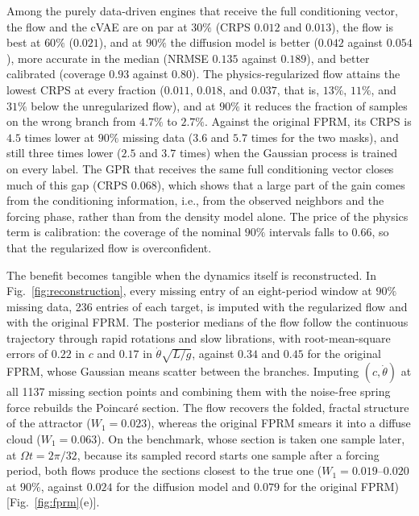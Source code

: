 Among the purely data-driven engines that receive the full conditioning vector, the flow and the cVAE are on par at $30\%$ (CRPS $0.012$ and $0.013$), the flow is best at $60\%$ ($0.021$), and at $90\%$ the diffusion model is better ($0.042$ against $0.054$), more accurate in the median (NRMSE $0.135$ against $0.189$), and better calibrated (coverage $0.93$ against $0.80$). The physics-regularized flow attains the lowest CRPS at every fraction ($0.011$, $0.018$, and $0.037$, that is, $13\%$, $11\%$, and $31\%$ below the unregularized flow), and at $90\%$ it reduces the fraction of samples on the wrong branch from $4.7\%$ to $2.7\%$. Against the original FPRM, its CRPS is $4.5$ times lower at $90\%$ missing data ($3.6$ and $5.7$ times for the two masks), and still three times lower ($2.5$ and $3.7$ times) when the Gaussian process is trained on every label. The GPR that receives the same full conditioning vector closes much of this gap (CRPS $0.068$), which shows that a large part of the gain comes from the conditioning information, i.e., from the observed neighbors and the forcing phase, rather than from the density model alone. The price of the physics term is calibration: the coverage of the nominal $90\%$ intervals falls to $0.66$, so that the regularized flow is overconfident.

The benefit becomes tangible when the dynamics itself is reconstructed. In Fig.~\ref{fig:reconstruction}, every missing entry of an eight-period window at $90\%$ missing data, 236 entries of each target, is imputed with the regularized flow and with the original FPRM. The posterior medians of the flow follow the continuous trajectory through rapid rotations and slow librations, with root-mean-square errors of $0.22$ in $c$ and $0.17$ in $\dot\theta\sqrt{L/g}$, against $0.34$ and $0.45$ for the original FPRM, whose Gaussian means scatter between the branches. Imputing $(c,\dot\theta)$ at all 1137 missing section points and combining them with the noise-free spring force rebuilds the Poincar\'e section. The flow recovers the folded, fractal structure of the attractor ($W_1=0.023$), whereas the original FPRM smears it into a diffuse cloud ($W_1=0.063$). On the benchmark, whose section is taken one sample later, at $\Omega t=2\pi/32$, because its sampled record starts one sample after a forcing period, both flows produce the sections closest to the true one ($W_1=0.019$--$0.020$ at $90\%$, against $0.024$ for the diffusion model and $0.079$ for the original FPRM) [Fig.~\ref{fig:fprm}(e)].

